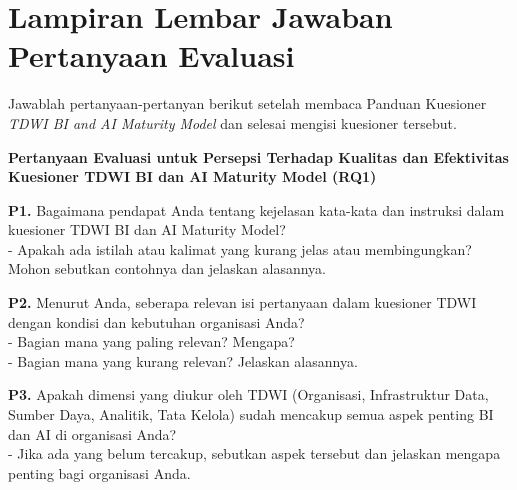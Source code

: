 \documentclass{article}
\begin{document}
\newpage
\onecolumn

\section{Lampiran Lembar Jawaban Pertanyaan Evaluasi}

Jawablah pertanyaan-pertanyan berikut setelah membaca Panduan Kuesioner \textit{TDWI BI and AI Maturity Model} dan selesai mengisi kuesioner tersebut.

\vspace{10pt}

\large{\textbf{Pertanyaan Evaluasi untuk Persepsi Terhadap Kualitas dan Efektivitas Kuesioner TDWI BI dan AI Maturity Model (RQ1)}}


\vspace{15pt}

\textbf{P1.} Bagaimana pendapat Anda tentang kejelasan kata-kata dan instruksi dalam kuesioner TDWI BI dan AI Maturity Model?\\
- Apakah ada istilah atau kalimat yang kurang jelas atau membingungkan? Mohon sebutkan contohnya dan jelaskan alasannya.

\vspace{10pt}
\noindent\framebox[\textwidth][l]{\parbox[t][5cm][t]{\textwidth}{}}

\vspace{15pt}

\textbf{P2.} Menurut Anda, seberapa relevan isi pertanyaan dalam kuesioner TDWI dengan kondisi dan kebutuhan organisasi Anda?\\
- Bagian mana yang paling relevan? Mengapa?\\
- Bagian mana yang kurang relevan? Jelaskan alasannya.

\vspace{10pt}
\noindent\framebox[\textwidth][l]{\parbox[t][5cm][t]{\textwidth}{}}

\vspace{15pt}

\textbf{P3.} Apakah dimensi yang diukur oleh TDWI (Organisasi, Infrastruktur Data, Sumber Daya, Analitik, Tata Kelola) sudah mencakup semua aspek penting BI dan AI di organisasi Anda?\\
- Jika ada yang belum tercakup, sebutkan aspek tersebut dan jelaskan mengapa penting bagi organisasi Anda.

\vspace{10pt}
\noindent\framebox[\textwidth][l]{\parbox[t][5cm][t]{\textwidth}{}}
\end{document}
